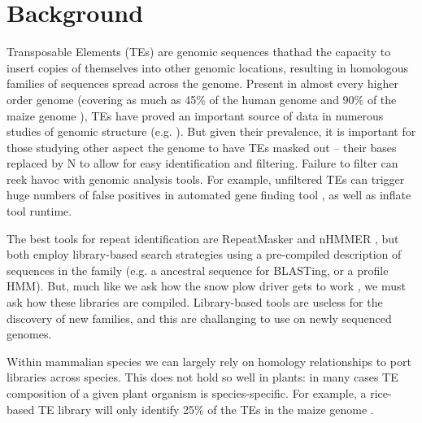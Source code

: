 \documentclass{bmcart}
\begin{document}
\newtheorem{definition}{Definition}
\newtheorem{observation}{Observation}
\newtheorem{lemma}{Lemma}
\newtheorem{theorem}{Theorem}

\section*{Background}
Transposable Elements (TEs) are genomic sequences thathad the capacity
to insert copies of themselves into other genomic locations, resulting
in homologous families of sequences spread across the genome.  Present
in almost every higher order genome (covering as much as 45\% of the
human genome and 90\% of the maize genome
\cite{Venter:2001p92,SanMiguel:1996wa}), TEs have proved an important
source of data in numerous studies of genomic structure (e.g.
\cite{Arndt:2005p279,Karro:2008p123,Mugal:2009p581,Hardison:2003p97}).
But given their prevalence, it is important for those studying other
aspect the genome to have TEs masked out -- their bases replaced by N
to allow for easy identification and filtering.  Failure to filter can
reek havoc with genomic analysis tools.  For example, unfiltered TEs can trigger
huge numbers of false positives in automated gene finding tool
\cite{Jiang:2013jt}, as well as inflate tool runtime.

The best tools for repeat identification are RepeatMasker and nHMMER
\cite{RepeatMaskerOpen:XkNxXSd7,Wheeler:2013gj}, but both employ 
library-based search strategies using a pre-compiled
description of sequences in the family (e.g. a ancestral sequence for
BLASTing, or a profile HMM).  But, much like we ask how
the snow plow driver gets to work \cite{Pratchett:uw}, we must ask how
these libraries are compiled.  Library-based tools
are useless for the discovery of new families, and this are
challanging to use on newly sequenced genomes.



Within mammalian species we can largely rely on homology relationships
to port libraries across species.  This does not hold
so well in plants: in many cases TE composition of a given plant
organism is species-specific.  For example, a rice-based TE library
will only identify 25\% of the TEs in the maize genome
\cite{Jiang:2013jt}.
\end{document}
